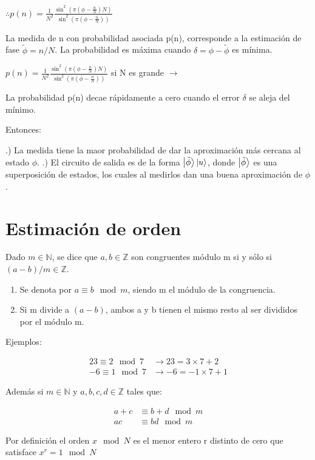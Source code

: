 $\therefore p(n) = \frac{1}{N^2} \frac{\sin^2(\pi (\phi - \frac{n}{N}) N)}{\sin^2(\pi (\phi - \frac{n}{N}))}$

La medida de n con probabilidad asociada p(n), corresponde a la estimación de fase $\tilde{\phi} = n/N$. La probabilidad es máxima cuando $\delta = \phi - \tilde{\phi}$ es mínima.

$p(n) = \frac{1}{N^2} \frac{\sin^2(\pi (\phi - \frac{n}{N}) N)}{\sin^2(\pi (\phi - \frac{n}{N}))}$ si N es grande $\rightarrow$ %

La probabilidad p(n) decae rápidamente a cero cuando el error $\delta$ se aleja del mínimo.

Entonces:

.) La medida tiene la maor probabilidad de dar la aproximación más cercana al estado $\phi$.
.) El circuito de salida es de la forma $\ket{\tilde{\phi}} \ket{u}$, donde $\ket{\tilde{\phi}}$ es una superposición de estados, los cuales al medirlos dan una buena aproximación de $\phi$.

\section{Estimación de orden}

Dado $m \in \mathds{N}$, se dice que $a,b \in \mathds{Z}$ son congruentes módulo m si y sólo si $(a-b)/m \in \mathds{Z}$.

\begin{enumerate}
    \item Se denota por $a \equiv b \mod m$, siendo m el módulo de la congruencia.
    \item Si m divide a $(a-b)$, ambos a y b tienen el mismo resto al ser divididos por el módulo m.
\end{enumerate}

 Ejemplos:

\begin{align*}
    23 \equiv 2 \mod 7 &\rightarrow 23 = 3 \times 7 + 2 \\
    -6 \equiv 1 \mod 7 &\rightarrow -6 = -1 \times 7 +1
\end{align*}

 Además si $m \in \mathds{N}$ y $a,b,c,d \in \mathds{Z}$ tales que:

\begin{align*}
    a+c &\equiv b+d \mod m \\
    a c &\equiv b d \mod m
\end{align*}

 Por definición el orden $x \mod N$ es el menor entero r distinto de cero que satisface $x^r = 1 \mod N$
 
